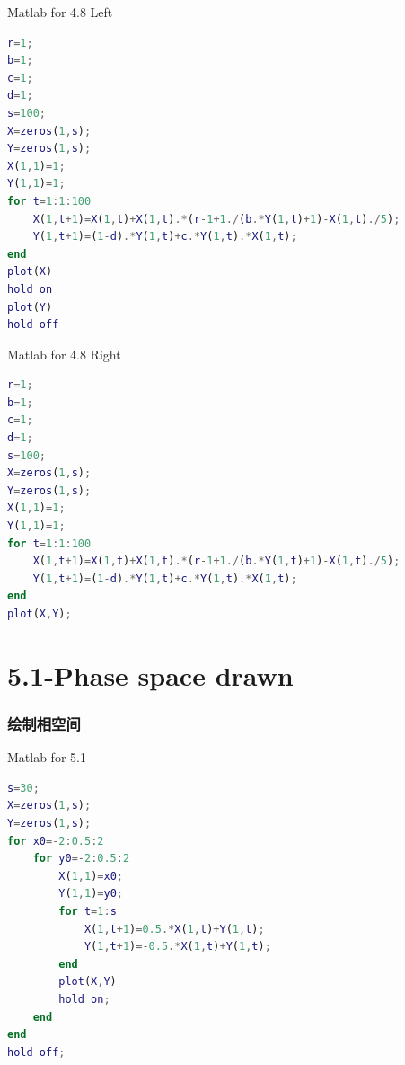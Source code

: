 \documentclass{beamer}
\begin{document}



\begin{frame}[fragile]{Matlab for 4.8 Left}
 \begin{lstlisting}[language=Matlab ,style=mystyle]
r=1;
b=1;
c=1;
d=1;
s=100;
X=zeros(1,s);                                                         
Y=zeros(1,s);
X(1,1)=1;                                                             
Y(1,1)=1;
for t=1:1:100
    X(1,t+1)=X(1,t)+X(1,t).*(r-1+1./(b.*Y(1,t)+1)-X(1,t)./5);
    Y(1,t+1)=(1-d).*Y(1,t)+c.*Y(1,t).*X(1,t);
end
plot(X)
hold on
plot(Y)
hold off
\end{lstlisting}
\end{frame}

\begin{frame}[fragile]{Matlab for 4.8 Right}
 \begin{lstlisting}[language=Matlab ,style=mystyle]
r=1;
b=1;
c=1;
d=1;
s=100;
X=zeros(1,s);
Y=zeros(1,s);
X(1,1)=1;
Y(1,1)=1;
for t=1:1:100
    X(1,t+1)=X(1,t)+X(1,t).*(r-1+1./(b.*Y(1,t)+1)-X(1,t)./5);
    Y(1,t+1)=(1-d).*Y(1,t)+c.*Y(1,t).*X(1,t);
end
plot(X,Y);
\end{lstlisting}
\end{frame}



\section{5.1-Phase space drawn}
     \begin{frame}[fragile]
      \frametitle{绘制相空间}
\begin{alertblock}{Matlab for 5.1}
\begin{lstlisting}[language=Matlab ,style=mystyle]
s=30;
X=zeros(1,s);
Y=zeros(1,s);
for x0=-2:0.5:2
    for y0=-2:0.5:2
        X(1,1)=x0;
        Y(1,1)=y0;
        for t=1:s
            X(1,t+1)=0.5.*X(1,t)+Y(1,t);
            Y(1,t+1)=-0.5.*X(1,t)+Y(1,t);
        end
        plot(X,Y)
        hold on;
    end
end
hold off;
\end{lstlisting}
\end{alertblock}

\end{frame}
\end{document}
